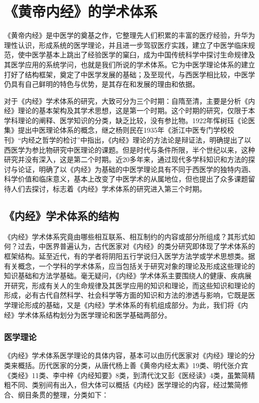 \documentclass[draft,12pt]{ctexbook}
\begin{document}
\pagestyle{main}
\fi
\chapter{《黄帝内经》的学术体系} %

《黄帝内经》是中医学的奠基之作，它整理先人们积累的丰富的医疗经验，升华为理性认识，形成系统的医学理论，并且进一步驾驭医疗实践，建立了中医学临床规范，使中医学基本上跳出了经验医学的窠臼，成为中国传统科学中探讨生命规律及其医学应用的系统学问，也就是我们所说的学术体系。它为中医学理论体系的建立打好了结构框架，奠定了中医学发展的基础；及至现代，与西医学相比较，中医学仍具有自己鲜明的特色与优势，是其存在和发展的理由和依据。

对于《内经》学术体系的研究，大致可分为三个时期：自隋至清，主要是分析《内经》理论的基本架构及其学术思想，这是第一个时期。这个时期的研究，仅限于本学科理论的阐释、医学知识的分类，缺乏比较，没有参比物。1922年恽树珏《论医集》提出中医理论体系的概念，继之杨则民在1935年《浙江中医专门学校校刊》“内经之哲学的检讨”中指出，《内经》理论的方法论是辩证法，明确提出了以西医学为参比物研究中医理论的课题。但是时代与条件所限，半个世纪以来，这种研究并没有深入，这是第二个时期。近20多年来，通过现代多学科知识和方法的探讨与论证，明确了以《内经》为基础的中医学理论具有不同于西医学的独特内涵、科学价值和临床意义，基本上改变了中医学术的从属地位，但也提出了众多课题留待人们去探讨，标志着《内经》学术体系的研究进入第三个时期。

\section{《内经》学术体系的结构} %

《内经》学术体系究竟由哪些相互联系、相互制约的内容或部分所组成？其形式如何？过去，中医界普遍认为，古代医家对《内经》的类分研究即体现了学术体系的框架结构。延至近代，有的学者将阴阳五行学说归入医学方法学或学术思想类。据有关概念，一个学科的学术体系，应当包括关于研究对象的理论及形成这些理论的知识基础和方法学基础。毫无疑问，《内经》学术体系主要围绕人的健康、疾病展开研究，形成有关人的生命规律及其医学应用的知识和理论，而这些知识和理论的形成，必有古代自然科学、社会科学等方面的知识和方法的渗透与影响，它既是医学理论形成的基础，又是《内经》学术体系的有机组成部分。为此，我们将《内经》学术体系结构划分为医学理论和医学基础两部分。

\subsection{医学理论} %

《内经》学术体系医学理论的具体内容，基本可以由历代医家对《内经》理论的分类来概括。历代医家的分类，从唐代杨上善《黄帝内经太素》19类、明代张介宾《类经》11类、李中梓《内经知要》8类，到清代沈又彭《医经读》4类，虽繁简精粗不同、类别间有出入，但大体可以概括《内经》医学理论的内容，经过繁简修合、纲目条贯的整理，分类如下：
\end{document}
